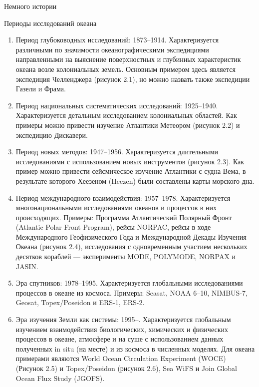 \begin{chapter}{Немного истории}
\begin{section}{Периоды исследований океана}
\begin{enumerate}
\item
Период глубоководных исследований: 1873--1914. Характеризуется
различными по значимости океанографическими экспедициями направленными
на выяснение поверхностных и глубинных характеристик океана возле
колониальных земель. Основным примером здесь является экспедиция
Челленджера (рисунок 2.1), но можно назвать также экспедиции Газели и
Фрама.

\item
Период национальных систематических исследований: 1925--1940.
Характеризуется детальным исследованием колониальных областей. Как
примеры можно привести изучение Атлантики Метеором (рисунок 2.2) и
экспедицию Дискавери.

\item
Период новых методов: 1947--1956. Характеризуется длительными
исследованиями с использованием новых инструментов (рисунок 2.3). Как
пример можно привести сейсмическое изучение Атлантики с судна Вема, в
результате которого Хеезеном (Heezen) были составлены карты морского
дна.

\item
Период международного взаимодействия: 1957--1978. Характеризуется
многонациональными исследованиями океанов и процессов в них
происходящих. Примеры: Программа Атлантический Полярный Фронт
(Atlantic Polar Front Program), рейсы NORPAC, рейсы в ходе
Международного Геофизического Года и Международной Декады Изучения
Океана (рисунок 2.4), исследования с одновременным участием нескольких
десятков кораблей --- эксперименты MODE, POLYMODE, NORPAX и JASIN.

\item
Эра спутников: 1978--1995. Характеризуется глобальными
исследованиями процессов в океане из космоса. Примеры: Seasat, 
NOAA 6--10, NIMBUS-7, Geosat, Topex/Poseidon и ERS-1, ERS-2.

\item
Эра изучения Земли как системы: 1995--. Характеризуется глобальным
изучением взаимодействия биологических, химических и физических
процессов в океане, атмосфере и на суше с использованием данных
полученных in situ (на месте) и из космоса в численных моделях. Для
океана примерами являются World Ocean Circulation Experiment (WOCE)
(Рисунок 2.5) и Topex/Poseidon (рисунок 2.6), Sea WiFS и Join Global
Ocean Flux Study (JGOFS).
\end{enumerate}

\end{section}


\end{chapter}
